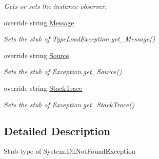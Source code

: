 \begin{DoxyCompactItemize}
\begin{DoxyCompactList}\small\item\em Gets or sets the instance observer.\end{DoxyCompactList}\item 
override string \hyperlink{class_system_1_1_fakes_1_1_stub_dll_not_found_exception_ad83cc280260af6083807f2819b694885}{Message}
\begin{DoxyCompactList}\small\item\em Sets the stub of Type\-Load\-Exception.\-get\-\_\-\-Message()\end{DoxyCompactList}\item 
override string \hyperlink{class_system_1_1_fakes_1_1_stub_dll_not_found_exception_a890f628e0dddc03747667fa798e4b348}{Source}
\begin{DoxyCompactList}\small\item\em Sets the stub of Exception.\-get\-\_\-\-Source()\end{DoxyCompactList}\item 
override string \hyperlink{class_system_1_1_fakes_1_1_stub_dll_not_found_exception_a103f2f681755efbb7c7157a3135463e0}{Stack\-Trace}
\begin{DoxyCompactList}\small\item\em Sets the stub of Exception.\-get\-\_\-\-Stack\-Trace()\end{DoxyCompactList}\end{DoxyCompactItemize}


\subsection{Detailed Description}
Stub type of System.\-Dll\-Not\-Found\-Exception




